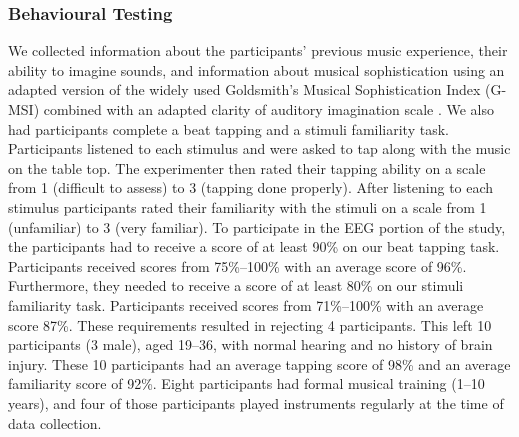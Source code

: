 \subsubsection*{Behavioural Testing}
We collected information about the participants' previous music experience, their ability to imagine sounds, and information about musical sophistication using an adapted version of the widely used Goldsmith's Musical Sophistication Index (G-MSI) \cite{mullensiefen_musicality_2014} combined with an adapted clarity of auditory imagination scale \cite{willander_imagery_scale_2010}. 
We also had participants complete a beat tapping and a stimuli familiarity task. 
Participants listened to each stimulus and were asked to tap along with the music on the table top. The experimenter then rated their tapping ability on a scale from 1 (difficult to assess) to 3 (tapping done properly). 
After listening to each stimulus participants rated their familiarity with the stimuli on a scale from 1 (unfamiliar) to 3 (very familiar).
To participate in the \ac{EEG} portion of the study, the participants had to receive a score of at least 90\% on our beat tapping task. Participants received scores from 75\%--100\% with an average score of 96\%.
Furthermore, they needed to receive a score of at least 80\% on our stimuli familiarity task. 
Participants received scores from 71\%--100\% with an average score 87\%.
These requirements resulted in rejecting 4 participants.
This left 10 participants (3 male), aged 19--36, with normal hearing and no history of brain injury. 
These 10 participants had an average tapping score of 98\% and an average familiarity score of 92\%.
Eight participants had formal musical training (1--10 years), and four of those participants played instruments regularly at the time of data collection.

